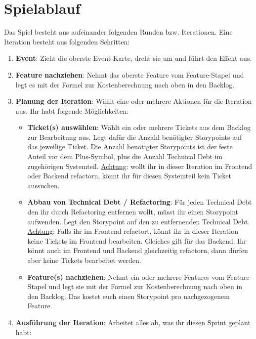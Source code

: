 \documentclass[a4paper, 11pt]{scrartcl}
\begin{document}
\newpage

\section*{Spielablauf}

Das Spiel besteht aus aufeinander folgenden Runden bzw. Iterationen. Eine Iteration besteht aus folgenden Schritten:

\begin{enumerate}
    \item \textbf{Event}: Zieht die oberste Event-Karte, dreht sie um und führt den Effekt aus.
    \item \textbf{Feature nachziehen}: Nehmt das oberste Feature vom Feature-Stapel und legt es mit der Formel zur Kostenberechnung nach oben in den Backlog.
    \item \textbf{Planung der Iteration}: Wählt eine oder mehrere Aktionen für die Iteration aus. Ihr habt folgende Möglichkeiten:
    \begin{itemize}
        \item \textbf{Ticket(s) auswählen}: Wählt ein oder mehrere Tickets aus dem Backlog zur Bearbeitung aus. Legt dafür die Anzahl benötigter Storypoints auf das jeweilige Ticket. Die Anzahl benötigter Storypoints ist der feste Anteil vor dem Plus-Symbol, plus die Anzahl Technical Debt im zugehörigen Systemteil. \underline{Achtung}: wollt ihr in dieser Iteration im Frontend oder Backend refactorn, könnt ihr für diesen Systemteil kein Ticket aussuchen.
        \item \textbf{Abbau von Technical Debt / Refactoring}: Für jeden Technical Debt den ihr durch Refactoring entfernen wollt, müsst ihr einen Storypoint aufwenden. Legt den Storypoint auf den zu entfernenden Technical Debt. \underline{Achtung}: Falls ihr im Frontend refactort, könnt ihr in dieser Iteration keine Tickets im Frontend bearbeiten. Gleiches gilt für das Backend. Ihr könnt auch im Frontend und Backend gleichzeitig refactorn, dann dürfen aber keine Tickets bearbeitet werden.
        \item \textbf{Feature(s) nachziehen}: Nehmt ein oder mehrere Features vom Feature-Stapel und legt sie mit der Formel zur Kostenberechnung nach oben in den Backlog. Das kostet euch einen Storypoint pro nachgezogenem Feature.
    \end{itemize}
    \item \textbf{Ausführung der Iteration}: Arbeitet alles ab, was ihr diesen Sprint geplant habt:
    \begin{itemize}

\end{itemize}
\end{enumerate}
\end{document}

